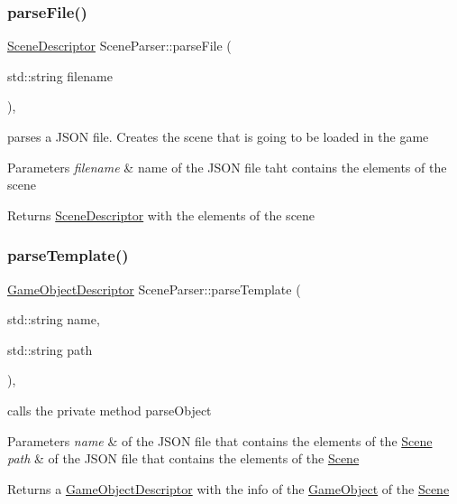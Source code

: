 \subsubsection{\texorpdfstring{parse\+File()}{parseFile()}}
{\footnotesize\ttfamily \hyperlink{class_mason_1_1_scene_descriptor}{Scene\+Descriptor} Scene\+Parser\+::parse\+File (\begin{DoxyParamCaption}\item[{std\+::string}]{filename }\end{DoxyParamCaption})\hspace{0.3cm}{\ttfamily [static]}, {\ttfamily [protected]}}



parses a J\+S\+ON file. Creates the scene that is going to be loaded in the game 


\begin{DoxyParams}{Parameters}
{\em filename} & name of the J\+S\+ON file taht contains the elements of the scene \\
\hline
\end{DoxyParams}
\begin{DoxyReturn}{Returns}
\hyperlink{class_mason_1_1_scene_descriptor}{Scene\+Descriptor} with the elements of the scene 
\end{DoxyReturn}
\hypertarget{class_mason_1_1_scene_parser_a3e637ac719b878f7c11741b7c0d6c443}{}\label{class_mason_1_1_scene_parser_a3e637ac719b878f7c11741b7c0d6c443} 
\subsubsection{\texorpdfstring{parse\+Template()}{parseTemplate()}}
{\footnotesize\ttfamily \hyperlink{class_mason_1_1_game_object_descriptor}{Game\+Object\+Descriptor} Scene\+Parser\+::parse\+Template (\begin{DoxyParamCaption}\item[{std\+::string}]{name,  }\item[{std\+::string}]{path }\end{DoxyParamCaption})\hspace{0.3cm}{\ttfamily [static]}, {\ttfamily [protected]}}



calls the private method parse\+Object 


\begin{DoxyParams}{Parameters}
{\em name} & of the J\+S\+ON file that contains the elements of the \hyperlink{class_mason_1_1_scene}{Scene} \\
\hline
{\em path} & of the J\+S\+ON file that contains the elements of the \hyperlink{class_mason_1_1_scene}{Scene} \\
\hline
\end{DoxyParams}
\begin{DoxyReturn}{Returns}
a \hyperlink{class_mason_1_1_game_object_descriptor}{Game\+Object\+Descriptor} with the info of the \hyperlink{class_mason_1_1_game_object}{Game\+Object} of the \hyperlink{class_mason_1_1_scene}{Scene} 
\end{DoxyReturn}


